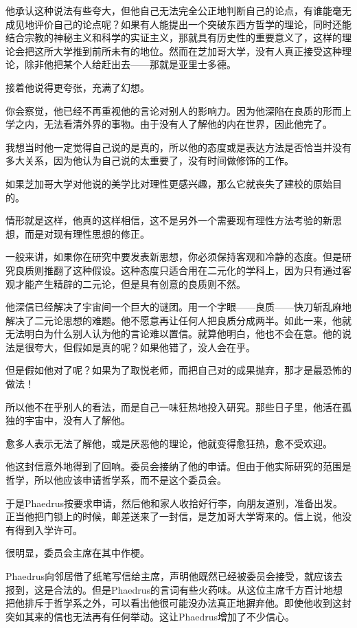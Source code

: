 \documentclass[UTF8]{article}
\begin{document}
\par 他承认这种说法有些夸大，但他自己无法完全公正地判断自己的论点，有谁能毫无成见地评价自己的论点呢？如果有人能提出一个突破东西方哲学的理论，同时还能结合宗教的神秘主义和科学的实证主义，那就具有历史性的重要意义了，这样的理论会把这所大学推到前所未有的地位。然而在芝加哥大学，没有人真正接受这种理论，除非他把某个人给赶出去——那就是亚里士多德。
\par 接着他说得更夸张，充满了幻想。
\par 你会察觉，他已经不再重视他的言论对别人的影响力。因为他深陷在良质的形而上学之内，无法看清外界的事物。由于没有人了解他的内在世界，因此他完了。
\par 我想当时他一定觉得自己说的是真的，所以他的态度或是表达方法是否恰当并没有多大关系，因为他认为自己说的太重要了，没有时间做修饰的工作。
\par 如果芝加哥大学对他说的美学比对理性更感兴趣，那么它就丧失了建校的原始目的。
\par 情形就是这样，他真的这样相信，这不是另外一个需要现有理性方法考验的新思想，而是对现有理性思想的修正。
\par 一般来讲，如果你在研究中要发表新思想，你必须保持客观和冷静的态度。但是研究良质则推翻了这种假设。这种态度只适合用在二元化的学科上，因为只有通过客观才能产生精辟的二元论，但是具有创意的良质则不然。
\par 他深信已经解决了宇宙间一个巨大的谜团。用一个字眼——良质——快刀斩乱麻地解决了二元论思想的难题。他不愿意再让任何人把良质分成两半。如此一来，他就无法明白为什么别人认为他的言论难以置信。就算他明白，他也不会在意。他的说法是很夸大，但假如是真的呢？如果他错了，没人会在乎。
\par 但是假如他对了呢？如果为了取悦老师，而把自己对的成果抛弃，那才是最恐怖的做法！
\par 所以他不在乎别人的看法，而是自己一味狂热地投入研究。那些日子里，他活在孤独的宇宙中，没有人了解他。
\par 愈多人表示无法了解他，或是厌恶他的理论，他就变得愈狂热，愈不受欢迎。
\par 他这封信意外地得到了回响。委员会接纳了他的申请。但由于他实际研究的范围是哲学，所以他应该申请哲学系，而不是这个委员会。
\par 于是Phaedrus按要求申请，然后他和家人收拾好行李，向朋友道别，准备出发。正当他把门锁上的时候，邮差送来了一封信，是芝加哥大学寄来的。信上说，他没有得到入学许可。
\par 很明显，委员会主席在其中作梗。
\par Phaedrus向邻居借了纸笔写信给主席，声明他既然已经被委员会接受，就应该去报到，这是合法的。但是Phaedrus的言词有些火药味。从这位主席千方百计地想把他排斥于哲学系之外，可以看出他很可能没办法真正地摒弃他。即使他收到这封突如其来的信也无法再有任何举动。这让Phaedrus增加了不少信心。
\end{document}
